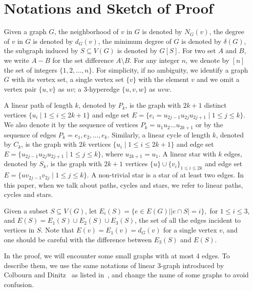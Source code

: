 \documentclass[a4paper]{article}
\newcommand{\emphd}[1]{{\fontseries{b}\selectfont\textsf{#1}}}
\begin{document}
\section{Notations and Sketch of Proof}

Given a graph $G$, the neighborhood of $v$ in $G$ is denoted by $N_G(v)$, the degree of $v$ in $G$ is denoted by $d_G(v)$, the minimum degree of $G$ is denoted by $\delta(G)$, the subgraph induced by $S\subseteq V(G)$ is denoted by $G[S]$. For two set $A$ and $B$, we write $A-B$ for the set difference $A\setminus B$. For any integer $n$, we denote by $[n]$ the set of integers $\{1,2,\ldots,n\}$. For simplicity, if no ambiguity, we identify a graph $G$ with its vertex set, a single vertex set $\{v\}$ with the element $v$ and we omit a vertex pair $\{u,v\}$ as $uv$; a 3-hyperedge $\{u,v,w\}$ as $uvw$. 

A \emphd{linear path of length $k$}, denoted by $P_k$, is the graph with $2k+1$ distinct vertices $\{u_i\mid 1\le i \le 2k+1\}$ and edge set $E = \{e_i=u_{2j-1}u_{2j}u_{2j+1}\mid 1\le j \le k\}.$ We also denote it by the sequence of vertices $P_k=u_1u_2\ldots u_{2k+1}$ or by the sequence of edges $P_k=e_1,e_2,\ldots,e_k$.
Similarly, a \emphd{linear cycle of length $k$}, denoted by $C_k$, is the graph with $2k$ vertices $\{u_i\mid 1\le i \le 2k+1\}$ and edge set $E = \{u_{2j-1}u_{2j}u_{2j+1}\mid 1\le j \le k\}$, where $u_{2k+1}=u_1$. 
A \emphd{linear star with $k$ edges}, denoted by $S_k$, is the graph with $2k+1$ vertices $\{u\}\cup\{v_i\}_{1\le i \le 2k}$ and edge set $E = \{uv_{2j-1}v_{2j}\mid 1\le j \le k\}.$ A non-trivial star is a star of at least two edges. In this paper, when we talk about paths, cycles and stars, we refer to linear paths, cycles and stars.


Given a subset $S\subseteq V(G)$, let $E_i(S) = \{e\in E (G)||e\cap S|=i\},$ for $1\le i\le 3$, and $E(S) =E_1(S) \cup E_2(S)\cup E_3(S)$, the set of all the edges incident to vertices in $S$. Note that $E(v) = E_1(v) = d_G(v)$ for a single vertex $v$, and one should be careful with the difference between $E_3(S)$ and $E(S)$.

In the proof, we will encounter some small graphs with at most 4 edges. To describe them, we use the same notations of linear 3-graph introduced by Colbourn and Dinitz~\cite{ea299c3877e64a5b996676debaabb8d3} as listed in~, and change the name of some graphs to avoid confusion.
\end{document}
